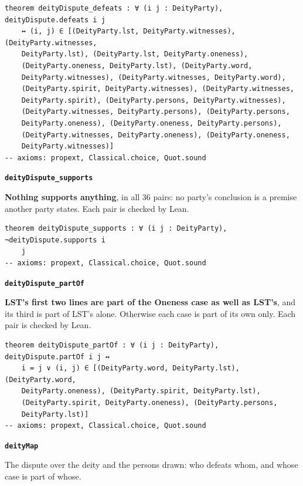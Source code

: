 \documentclass[11pt,paper=\testimonypaper,DIV=13,parskip=false]{scrartcl}
\begin{document}
{\small\begin{verbatim}
theorem deityDispute_defeats : ∀ (i j : DeityParty), deityDispute.defeats i j
    ↔ (i, j) ∈ [(DeityParty.lst, DeityParty.witnesses), (DeityParty.witnesses,
    DeityParty.lst), (DeityParty.lst, DeityParty.oneness),
    (DeityParty.oneness, DeityParty.lst), (DeityParty.word,
    DeityParty.witnesses), (DeityParty.witnesses, DeityParty.word),
    (DeityParty.spirit, DeityParty.witnesses), (DeityParty.witnesses,
    DeityParty.spirit), (DeityParty.persons, DeityParty.witnesses),
    (DeityParty.witnesses, DeityParty.persons), (DeityParty.persons,
    DeityParty.oneness), (DeityParty.oneness, DeityParty.persons),
    (DeityParty.witnesses, DeityParty.oneness), (DeityParty.oneness,
    DeityParty.witnesses)]
-- axioms: propext, Classical.choice, Quot.sound
\end{verbatim}}
\par\medskip\noindent\textbf{\texttt{deity\allowbreak{}Dispute\_\allowbreak{}supports}}\par\nobreak\noindent
\textbf{Nothing supports anything}, in all 36 pairs: no party’s conclusion is a premise another party states. Each pair is checked by Lean.

{\small\begin{verbatim}
theorem deityDispute_supports : ∀ (i j : DeityParty), ¬deityDispute.supports i
    j
-- axioms: propext, Classical.choice, Quot.sound
\end{verbatim}}
\par\medskip\noindent\textbf{\texttt{deity\allowbreak{}Dispute\_\allowbreak{}part\allowbreak{}Of}}\par\nobreak\noindent
\textbf{LST’s first two lines are part of the Oneness case as well as LST’s}, and its third is part of LST’s alone. Otherwise each case is part of its own only. Each pair is checked by Lean.

{\small\begin{verbatim}
theorem deityDispute_partOf : ∀ (i j : DeityParty), deityDispute.partOf i j ↔
    i = j ∨ (i, j) ∈ [(DeityParty.word, DeityParty.lst), (DeityParty.word,
    DeityParty.oneness), (DeityParty.spirit, DeityParty.lst),
    (DeityParty.spirit, DeityParty.oneness), (DeityParty.persons,
    DeityParty.lst)]
-- axioms: propext, Classical.choice, Quot.sound
\end{verbatim}}
\par\medskip\noindent\textbf{\texttt{deity\allowbreak{}Map}}\par\nobreak\noindent
The dispute over the deity and the persons drawn: who defeats whom, and whose case is part of whose.
\end{document}
